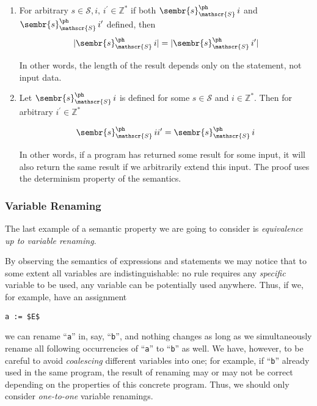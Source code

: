 \begin{enumerate}
\item For arbitrary $s\in\mathscr{S}$,$\,i,\,i^\prime\in\mathbb{Z}^*$ if both $\sembr{s}^\ph_\mathscr{S}\,i$ and $\sembr{s}^\ph_\mathscr{S}\,i^\prime$ defined, then
  \[
  |\sembr{s}^\ph_\mathscr{S}\,i|=|\sembr{s}^\ph_\mathscr{S}\,i^\prime|
  \]

  In other words, the length of the result depends only on the statement, not input data.

\item
  Let $\sembr{s}^\ph_\mathscr{S}\,i$ is defined for some $s\in\mathscr{S}$ and $i\in\mathbb{Z}^*$. Then for arbitrary $i^\prime\in\mathbb{Z}^*$

  \[
   \sembr{s}^\ph_\mathscr{S}\,ii^\prime=\sembr{s}^\ph_\mathscr{S}\,i
   \]

   In other words, if a program has returned some result for some input, it will also return the same result
   if we arbitrarily extend this input. The proof uses the determinism property of the semantics.
\end{enumerate}

\subsubsection{Variable Renaming}

The last example of a semantic property we are going to consider is \emph{equivalence up to variable renaming}.

By observing the semantics of expressions and statements we may notice that to some extent all variables
are indistinguishable: no rule requires any \emph{specific} variable to be used, any variable can be potentially used
anywhere. Thus, if we, for example, have an assignment

\begin{lstlisting}[mathescape=true]
   a := $E$
\end{lstlisting}

we can rename ``\lstinline|a|'' in, say, ``\lstinline|b|'', and nothing changes as long as we simultaneously
rename all following occurrencies of ``\lstinline|a|'' to ``\lstinline|b|'' as well. We have, however, to be
careful to avoid  \emph{coalescing} different variables into one; for example, if ``\lstinline|b|'' already
used in the same program, the result of renaming may or may not be correct depending on the properties
of this concrete program. Thus, we should only consider \emph{one-to-one} variable renamings.

